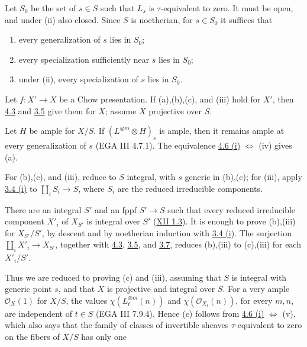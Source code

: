Let \(S_0\) be the set of \(s\in S\) such that \(L_s\) is
\(\tau\)-equivalent to zero. It must be open, and under (ii) also closed.
Since \(S\) is noetherian, for \(s\in S_0\) it suffices that
\begin{enumerate}[label=(\alph*)]
\item every generalization of \(s\) lies in \(S_0\);
\item every specialization sufficiently near \(s\) lies in \(S_0\);
\item under (ii), every specialization of \(s\) lies in \(S_0\).
\end{enumerate}

Let \(f:X'\to X\) be a Chow presentation. If (a),(b),(c), and (iii) hold
for \(X'\), then \hyperlink{sga6.e13.lem.4-3}{4.3} and \hyperlink{sga6.e13.thm.3-5}{3.5} give them for \(X\); assume \(X\) projective
over \(S\).

Let \(H\) be ample for \(X/S\). If
\((L^{\otimes m}\otimes H)_s\) is ample, then it remains ample at every
generalization of \(s\) (EGA III 4.7.1). The equivalence \hyperlink{sga6.e13.thm.4-6}{4.6
(i)} \(\Longleftrightarrow\) (iv) gives (a).

For (b),(c), and (iii), reduce to \(S\) integral, with \(s\) generic in
(b),(c); for (iii), apply \hyperlink{sga6.e13.lem.3-4}{3.4 (i)} to
\(\coprod_iS_i\to S\), where \(S_i\) are the reduced irreducible
components.

There are an integral \(S'\) and an fppf \(S'\to S\) such that every
reduced irreducible component \(X'_i\) of \(X_{S'}\) is integral over
\(S'\) (\hyperlink{sga6.e12.lem.1-3}{XII 1.3}). It is enough to prove (b),(iii) for \(X_{S'}/S'\), by
descent and by noetherian induction with \hyperlink{sga6.e13.lem.3-4}{3.4 (i)}. The surjection
\(\coprod_iX'_i\to X_{S'}\), together with \hyperlink{sga6.e13.lem.4-3}{4.3}, \hyperlink{sga6.e13.thm.3-5}{3.5}, and \hyperlink{sga6.e13.lem.3-7}{3.7}, reduces
(b),(iii) to (c),(iii) for each \(X'_i/S'\).

Thus we are reduced to proving (c) and (iii), assuming that \(S\) is
integral with generic point \(s\), and that \(X\) is projective and
integral over \(S\). For a very ample \(\mathcal O_X(1)\) for \(X/S\),
the values \(\chi(L_t^{\otimes m}(n))\) and
\(\chi(\mathcal O_{X_t}(n))\), for every \(m,n\), are independent of
\(t\in S\) (EGA III 7.9.4). Hence (c) follows from \hyperlink{sga6.e13.thm.4-6}{4.6
(i)} \(\Longleftrightarrow\) (v), which also says that the family of
classes of invertible sheaves \(\tau\)-equivalent to zero on the fibers
of \(X/S\) has only one

